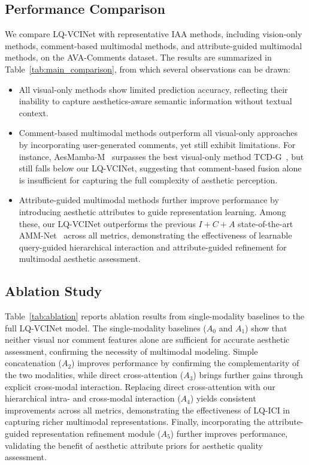 \documentclass[journal]{IEEEtran}
\begin{document}
\subsection{Performance Comparison}

We compare LQ-VCINet with representative IAA methods, including vision-only methods, comment-based multimodal methods, and attribute-guided multimodal methods, on the AVA-Comments dataset. The results are summarized in Table~\ref{tab:main_comparison}, from which several observations can be drawn:
\begin{itemize}
\item All visual-only methods show limited prediction accuracy, reflecting their inability to capture aesthetics-aware semantic information without textual context.
\item Comment-based multimodal methods outperform all visual-only approaches by incorporating user-generated comments, yet still exhibit limitations. For instance, AesMamba-M~\cite{gao2024aesmamba} surpasses the best visual-only method TCD-G~\cite{hou2025tcdg}, but still falls below our LQ-VCINet, suggesting that comment-based fusion alone is insufficient for capturing the full complexity of aesthetic perception.
\item Attribute-guided multimodal methods further improve performance by introducing aesthetic attributes to guide representation learning. Among these, our LQ-VCINet outperforms the previous $I+C+A$ state-of-the-art AMM-Net~\cite{li2023ammnet} across all metrics, demonstrating the effectiveness of learnable query-guided hierarchical interaction and attribute-guided refinement for multimodal aesthetic assessment.
\end{itemize}


\subsection{Ablation Study}

Table~\ref{tab:ablation} reports ablation results from single-modality baselines to the full LQ-VCINet model. The single-modality baselines ($A_0$ and $A_1$) show that neither visual nor comment features alone are sufficient for accurate aesthetic assessment, confirming the necessity of multimodal modeling. Simple concatenation ($A_2$) improves performance by confirming the complementarity of the two modalities, while direct cross-attention ($A_3$) brings further gains through explicit cross-modal interaction. Replacing direct cross-attention with our hierarchical intra- and cross-modal interaction ($A_4$) yields consistent improvements across all metrics, demonstrating the effectiveness of LQ-ICI in capturing richer multimodal representations. Finally, incorporating the attribute-guided representation refinement module ($A_5$) further improves performance, validating the benefit of aesthetic attribute priors for aesthetic quality assessment.
\end{document}
